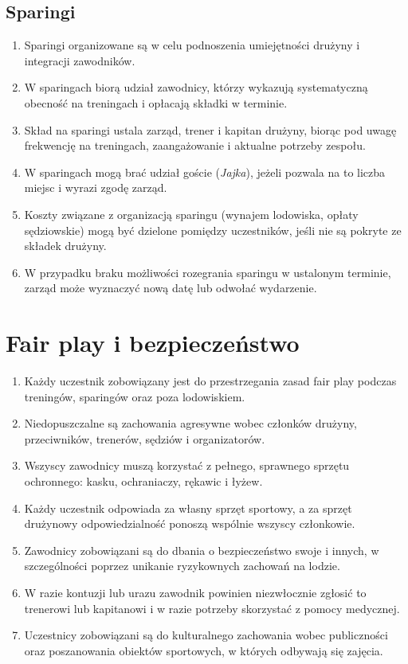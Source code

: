 \documentclass[12pt,a4paper]{article}
\let\stdsection\section
\renewcommand\section{\clearpage\stdsection}
\begin{document}
\subsection{Sparingi}
\begin{enumerate}
  \item Sparingi organizowane są w celu podnoszenia umiejętności drużyny i integracji zawodników.
  \item W sparingach biorą udział zawodnicy, którzy wykazują systematyczną obecność na treningach i opłacają składki w terminie.
  \item Skład na sparingi ustala zarząd, trener i kapitan drużyny, biorąc pod uwagę frekwencję na treningach, zaangażowanie i aktualne potrzeby zespołu.
  \item W sparingach mogą brać udział goście (\textit{Jajka}), jeżeli pozwala na to liczba miejsc i wyrazi zgodę zarząd.
  \item Koszty związane z organizacją sparingu (wynajem lodowiska, opłaty sędziowskie) mogą być dzielone pomiędzy uczestników, jeśli nie są pokryte ze składek drużyny.
  \item W przypadku braku możliwości rozegrania sparingu w ustalonym terminie, zarząd może wyznaczyć nową datę lub odwołać wydarzenie.
\end{enumerate}

\section{Fair play i bezpieczeństwo}
\begin{enumerate}
  \item Każdy uczestnik zobowiązany jest do przestrzegania zasad fair play podczas treningów, sparingów oraz poza lodowiskiem.
  \item Niedopuszczalne są zachowania agresywne wobec członków drużyny, przeciwników, trenerów, sędziów i organizatorów.
  \item Wszyscy zawodnicy muszą korzystać z pełnego, sprawnego sprzętu ochronnego: kasku, ochraniaczy, rękawic i łyżew.
  \item Każdy uczestnik odpowiada za własny sprzęt sportowy, a za sprzęt drużynowy odpowiedzialność ponoszą wspólnie wszyscy członkowie.
  \item Zawodnicy zobowiązani są do dbania o bezpieczeństwo swoje i innych, w szczególności poprzez unikanie ryzykownych zachowań na lodzie.
  \item W razie kontuzji lub urazu zawodnik powinien niezwłocznie zgłosić to trenerowi lub kapitanowi i w razie potrzeby skorzystać z pomocy medycznej.
  \item Uczestnicy zobowiązani są do kulturalnego zachowania wobec publiczności oraz poszanowania obiektów sportowych, w których odbywają się zajęcia.
\end{enumerate}
\end{document}
